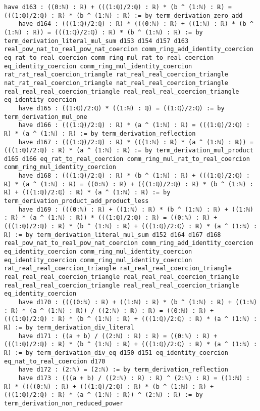 \documentclass{article}
\begin{document}
\begin{tcolorbox}[colback=white!10, width=\linewidth]
\begin{lstlisting}[language=Lean4]
    have d163 : ((0:ℕ) : ℝ) + (((1:ℚ)/2:ℚ) : ℝ) * (b ^ (1:ℕ) : ℝ) = (((1:ℚ)/2:ℚ) : ℝ) * (b ^ (1:ℕ) : ℝ) := by term_derivation_zero_add
    have d164 : (((1:ℚ)/2:ℚ) : ℝ) * (((0:ℕ) : ℝ) + ((1:ℕ) : ℝ) * (b ^ (1:ℕ) : ℝ)) = (((1:ℚ)/2:ℚ) : ℝ) * (b ^ (1:ℕ) : ℝ) := by term_derivation_literal_mul_sum d153 d154 d157 d163 real_pow_nat_to_real_pow_nat_coercion comm_ring_add_identity_coercion eq_rat_to_real_coercion comm_ring_mul_rat_to_real_coercion eq_identity_coercion comm_ring_mul_identity_coercion rat_rat_real_coercion_triangle rat_real_real_coercion_triangle nat_rat_real_coercion_triangle nat_real_real_coercion_triangle real_real_real_coercion_triangle real_real_real_coercion_triangle eq_identity_coercion
    have d165 : ((1:ℚ)/2:ℚ) * ((1:ℕ) : ℚ) = ((1:ℚ)/2:ℚ) := by term_derivation_mul_one
    have d166 : (((1:ℚ)/2:ℚ) : ℝ) * (a ^ (1:ℕ) : ℝ) = (((1:ℚ)/2:ℚ) : ℝ) * (a ^ (1:ℕ) : ℝ) := by term_derivation_reflection
    have d167 : (((1:ℚ)/2:ℚ) : ℝ) * (((1:ℕ) : ℝ) * (a ^ (1:ℕ) : ℝ)) = (((1:ℚ)/2:ℚ) : ℝ) * (a ^ (1:ℕ) : ℝ) := by term_derivation_mul_product d165 d166 eq_rat_to_real_coercion comm_ring_mul_rat_to_real_coercion comm_ring_mul_identity_coercion
    have d168 : (((1:ℚ)/2:ℚ) : ℝ) * (b ^ (1:ℕ) : ℝ) + (((1:ℚ)/2:ℚ) : ℝ) * (a ^ (1:ℕ) : ℝ) = ((0:ℕ) : ℝ) + (((1:ℚ)/2:ℚ) : ℝ) * (b ^ (1:ℕ) : ℝ) + (((1:ℚ)/2:ℚ) : ℝ) * (a ^ (1:ℕ) : ℝ) := by term_derivation_product_add_product_less
    have d169 : (((0:ℕ) : ℝ) + ((1:ℕ) : ℝ) * (b ^ (1:ℕ) : ℝ) + ((1:ℕ) : ℝ) * (a ^ (1:ℕ) : ℝ)) * (((1:ℚ)/2:ℚ) : ℝ) = ((0:ℕ) : ℝ) + (((1:ℚ)/2:ℚ) : ℝ) * (b ^ (1:ℕ) : ℝ) + (((1:ℚ)/2:ℚ) : ℝ) * (a ^ (1:ℕ) : ℝ) := by term_derivation_literal_mul_sum d152 d164 d167 d168 real_pow_nat_to_real_pow_nat_coercion comm_ring_add_identity_coercion eq_identity_coercion comm_ring_mul_identity_coercion eq_identity_coercion comm_ring_mul_identity_coercion rat_real_real_coercion_triangle rat_real_real_coercion_triangle real_real_real_coercion_triangle real_real_real_coercion_triangle real_real_real_coercion_triangle real_real_real_coercion_triangle eq_identity_coercion
    have d170 : ((((0:ℕ) : ℝ) + ((1:ℕ) : ℝ) * (b ^ (1:ℕ) : ℝ) + ((1:ℕ) : ℝ) * (a ^ (1:ℕ) : ℝ)) / ((2:ℕ) : ℝ) : ℝ) = ((0:ℕ) : ℝ) + (((1:ℚ)/2:ℚ) : ℝ) * (b ^ (1:ℕ) : ℝ) + (((1:ℚ)/2:ℚ) : ℝ) * (a ^ (1:ℕ) : ℝ) := by term_derivation_div_literal
    have d171 : ((a + b) / ((2:ℕ) : ℝ) : ℝ) = ((0:ℕ) : ℝ) + (((1:ℚ)/2:ℚ) : ℝ) * (b ^ (1:ℕ) : ℝ) + (((1:ℚ)/2:ℚ) : ℝ) * (a ^ (1:ℕ) : ℝ) := by term_derivation_div_eq d150 d151 eq_identity_coercion eq_nat_to_real_coercion d170
    have d172 : (2:ℕ) = (2:ℕ) := by term_derivation_reflection
    have d173 : (((a + b) / ((2:ℕ) : ℝ) : ℝ) ^ (2:ℕ) : ℝ) = ((1:ℕ) : ℝ) * ((((0:ℕ) : ℝ) + (((1:ℚ)/2:ℚ) : ℝ) * (b ^ (1:ℕ) : ℝ) + (((1:ℚ)/2:ℚ) : ℝ) * (a ^ (1:ℕ) : ℝ)) ^ (2:ℕ) : ℝ) := by term_derivation_non_reduced_power

\end{lstlisting}
\end{tcolorbox}
\end{document}
